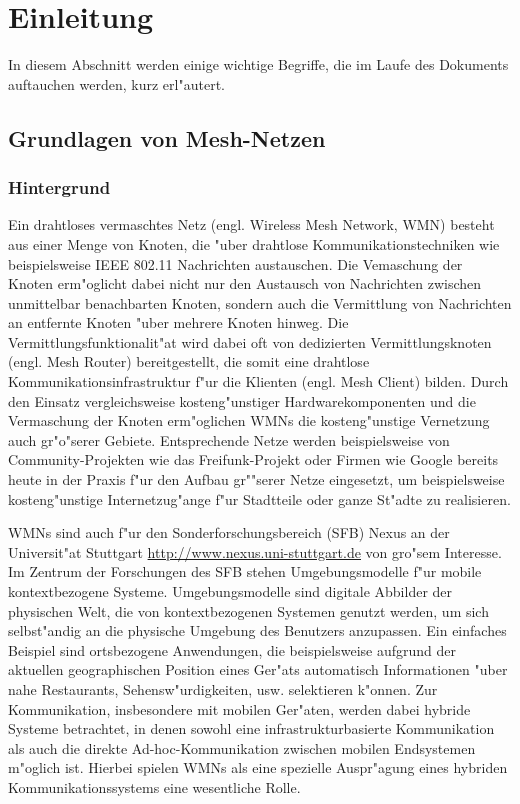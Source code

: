 \section{Einleitung}

In diesem Abschnitt werden einige wichtige Begriffe, die im Laufe des
Dokuments auftauchen werden, kurz erl"autert.

\subsection{Grundlagen von Mesh-Netzen}

\subsubsection{Hintergrund}

Ein drahtloses vermaschtes Netz (engl. Wireless Mesh Network, WMN) besteht
aus einer Menge von Knoten, die "uber drahtlose Kommunikationstechniken
wie beispielsweise IEEE 802.11 Nachrichten austauschen. Die
Vemaschung der Knoten erm"oglicht dabei nicht nur den Austausch von
Nachrichten zwischen unmittelbar benachbarten Knoten, sondern auch die
Vermittlung von Nachrichten an entfernte Knoten "uber mehrere Knoten
hinweg. Die Vermittlungsfunktionalit"at wird dabei oft von dedizierten
Vermittlungsknoten (engl. Mesh Router) bereitgestellt, die somit eine
drahtlose Kommunikationsinfrastruktur f"ur die Klienten (engl. Mesh
Client) bilden. Durch den Einsatz vergleichsweise kosteng"unstiger
Hardwarekomponenten und die Vermaschung der Knoten erm"oglichen WMNs die
kosteng"unstige Vernetzung auch gr"o"serer Gebiete. Entsprechende Netze
werden beispielsweise von Community-Projekten wie das Freifunk-Projekt
oder Firmen wie Google bereits heute in der Praxis f"ur den Aufbau gr""serer
Netze eingesetzt, um beispielsweise kosteng"unstige Internetzug"ange f"ur
Stadtteile oder ganze St"adte zu realisieren.

WMNs sind auch f"ur den Sonderforschungsbereich (SFB) Nexus an der
Universit"at Stuttgart
\url{http://www.nexus.uni-stuttgart.de} von gro"sem Interesse. Im
Zentrum der Forschungen des SFB stehen Umgebungsmodelle f"ur mobile
kontextbezogene Systeme. Umgebungsmodelle sind digitale Abbilder der
physischen Welt, die von kontextbezogenen Systemen genutzt werden, um
sich selbst"andig an die physische Umgebung des Benutzers anzupassen. Ein
einfaches Beispiel sind ortsbezogene Anwendungen, die beispielsweise
aufgrund der aktuellen geographischen Position eines Ger"ats automatisch
Informationen "uber nahe Restaurants, Sehensw"urdigkeiten, usw. selektieren
k"onnen. Zur Kommunikation, insbesondere mit mobilen Ger"aten, werden dabei
hybride Systeme betrachtet, in denen sowohl eine infrastrukturbasierte
Kommunikation als auch die direkte Ad-hoc-Kommunikation zwischen
mobilen Endsystemen m"oglich ist. Hierbei spielen WMNs als eine spezielle
Auspr"agung eines hybriden Kommunikationssystems eine wesentliche Rolle.

